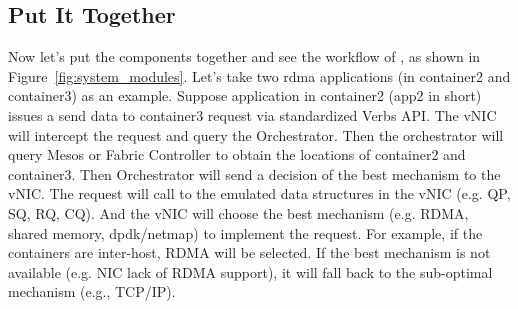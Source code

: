 \subsection{Put It Together}
Now let's put the components together and see the workflow of \sysname, as shown in Figure~\ref{fig:system_modules}.
Let's take two rdma applications (in container2 and container3) as an example.
Suppose application in container2 (app2 in short) issues a send data to container3 request via standardized Verbs API.
The vNIC will intercept the request and query the Orchestrator. 
Then the orchestrator will query Mesos or Fabric Controller to obtain the locations of 
container2 and container3. Then Orchestrator will send a decision of the best mechanism to the vNIC.
The request will call to the emulated data structures in the vNIC (e.g. QP, SQ, RQ, CQ). And the vNIC will choose the
best mechanism (e.g. RDMA, shared memory, dpdk/netmap) to implement the request. For example, if the containers
are inter-host, RDMA will be selected. If the best mechanism is not available (e.g. NIC lack of RDMA support), it will
fall back to the sub-optimal mechanism (e.g., TCP/IP).